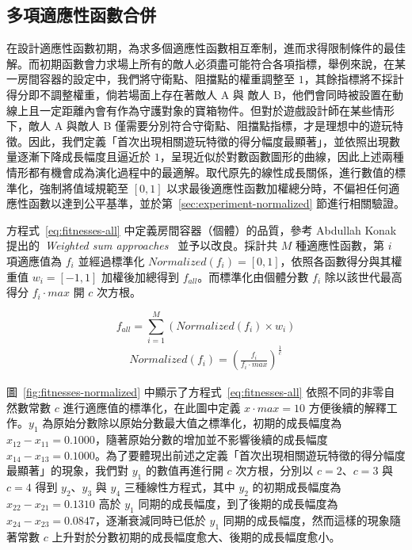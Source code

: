 \subsection{多項適應性函數合併}
\label{ssec:method-segments-multiobjectives}

在設計適應性函數初期，為求多個適應性函數相互牽制，進而求得限制條件的最佳解。而初期函數會力求場上所有的敵人必須盡可能符合各項指標，舉例來說，在某一房間容器的設定中，我們將守衛點、阻擋點的權重調整至 $1$，其餘指標將不採計得分即不調整權重，倘若場面上存在著敵人 A 與 敵人 B，他們會同時被設置在動線上且一定距離內會有作為守護對象的寶箱物件。但對於遊戲設計師在某些情形下，敵人 A 與敵人 B 僅需要分別符合守衛點、阻擋點指標，才是理想中的遊玩特徵。因此，我們定義「首次出現相關遊玩特徵的得分幅度最顯著」，並依照出現數量逐漸下降成長幅度且逼近於 $1$，呈現近似於對數函數圖形的曲線，因此上述兩種情形都有機會成為演化過程中的最適解。取代原先的線性成長關係，進行數值的標準化，強制將值域規範至 $[0, 1]$ 以求最後適應性函數加權總分時，不偏袒任何適應性函數以達到公平基準，並於第~\ref{sec:experiment-normalized} 節進行相關驗證。

方程式~\ref{eq:fitnesses-all} 中定義房間容器（個體）的品質，參考 Abdullah Konak 提出的~\textit{Weighted sum approaches}~\cite{konak2006multi} 並予以改良。採計共 $M$ 種適應性函數，第 $i$ 項適應值為 $f_{i}$ 並經過標準化 $Normalized(f_{i}) = [0, 1]$，依照各函數得分與其權重值 $w_{i} = [-1, 1]$ 加權後加總得到 $f_{all}$。而標準化由個體分數 $f_{i}$ 除以該世代最高得分 $f_{i}\cdot max$ 開 $c$ 次方根。

\begin{equation}
    \label{eq:fitnesses-all}
    f_{all} = \sum_{i=1}^{M} (Normalized(f_{i}) \times w_{i})
\end{equation}
\begin{gather*}
    Normalized(f_{i}) = (\frac{f_{i}}{f_{i}\cdot max})^{\frac{1}{c}}
\end{gather*}

圖~\ref{fig:fitnesses-normalized} 中顯示了方程式~\ref{eq:fitnesses-all} 依照不同的非零自然數常數 $c$ 進行適應值的標準化，在此圖中定義 $x\cdot max = 10$ 方便後續的解釋工作。$y_{1}$ 為原始分數除以原始分數最大值之標準化，初期的成長幅度為 $x_{12} - x_{11} = 0.1000$，隨著原始分數的增加並不影響後續的成長幅度 $x_{14} - x_{13} = 0.1000$。為了要體現出前述之定義「首次出現相關遊玩特徵的得分幅度最顯著」的現象，我們對 $y_{1}$ 的數值再進行開 $c$ 次方根，分別以 $c = 2$、$c = 3$ 與 $c = 4$ 得到 $y_{2}$、$y_{3}$ 與 $y_{4}$ 三種線性方程式，其中 $y_{2}$ 的初期成長幅度為 $x_{22} - x_{21} = 0.1310$ 高於 $y_{1}$ 同期的成長幅度，到了後期的成長幅度為 $x_{24} - x_{23} = 0.0847$，逐漸衰減同時已低於 $y_{1}$ 同期的成長幅度，然而這樣的現象隨著常數 $c$ 上升對於分數初期的成長幅度愈大、後期的成長幅度愈小。

